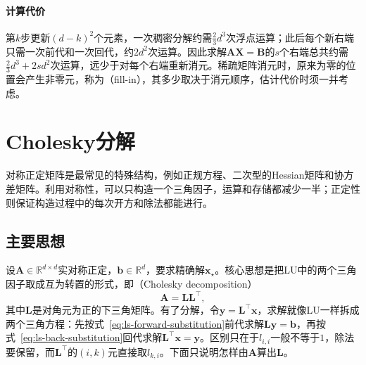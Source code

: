 \paragraph{计算代价}
第$k$步更新$(d-k)^2$个元素，一次稠密分解约需$\tfrac23d^3$次浮点运算；此后每个新右端只需一次前代和一次回代，约$2d^2$次运算。因此求解$\bm A\bm X=\bm B$的$s$个右端总共约需$\tfrac23d^3+2sd^2$次运算，远少于对每个右端重新消元。稀疏矩阵消元时，原来为零的位置会产生非零元，称为（fill-in），其多少取决于消元顺序，估计代价时须一并考虑。

\section{Cholesky分解}
\label{sec:ls-cholesky}

对称正定矩阵是最常见的特殊结构，例如正规方程、二次型的Hessian矩阵和协方差矩阵。利用对称性，可以只构造一个三角因子，运算和存储都减少一半；正定性则保证构造过程中的每次开方和除法都能进行。

\subsection{主要思想}
设$\bm A\in\mathbb R^{d\times d}$实对称正定，$\bm b\in\mathbb R^d$，要求精确解$\bm x_\star$。核心思想是把LU中的两个三角因子取成互为转置的形式，即（Cholesky decomposition）
\begin{equation}
 \bm A=\bm L\bm L^\top,
 \label{eq:matrix-analysis-cholesky}
\end{equation}
其中$\bm L$是对角元为正的下三角矩阵。有了分解，令$\bm y=\bm L^\top\bm x$，求解就像LU一样拆成两个三角方程：先按式~\eqref{eq:ls-forward-substitution}前代求解$\bm L\bm y=\bm b$，再按式~\eqref{eq:ls-back-substitution}回代求解$\bm L^\top\bm x=\bm y$。区别只在于$l_{i,i}$一般不等于$1$，除法要保留，而$\bm L^\top$的$(i,k)$元直接取$l_{k,i}$。下面只说明怎样由$\bm A$算出$\bm L$。

